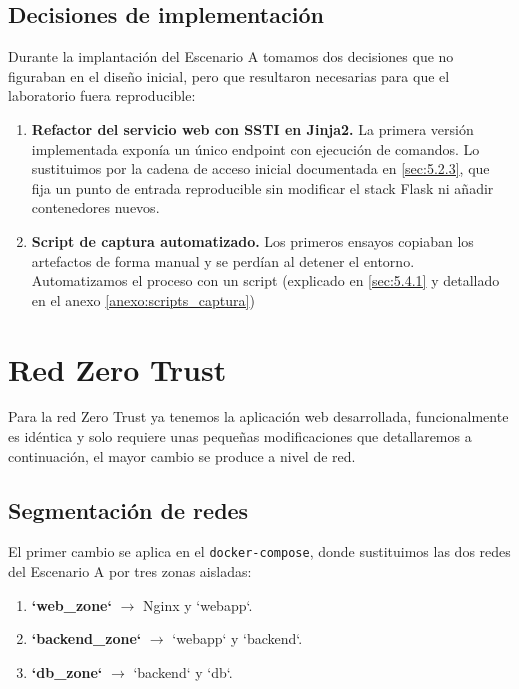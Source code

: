 \documentclass[11pt,spanish,listoffigures,listoftables]{tfgetsinf}
\begin{document}
        \FloatBarrier
        \subsection{Decisiones de implementación}
        \label{sec:5.2.5}

        Durante la implantación del Escenario A tomamos dos decisiones que no figuraban en el diseño inicial, pero que resultaron necesarias para que el laboratorio fuera reproducible:
        \begin{enumerate}
            \item \textbf{Refactor del servicio web con SSTI en Jinja2.} La primera versión implementada exponía un único endpoint con ejecución de comandos. Lo sustituimos por la cadena de acceso inicial documentada en \cref{sec:5.2.3}, que fija un punto de entrada reproducible sin modificar el stack Flask ni añadir contenedores nuevos.
            \item \textbf{Script de captura automatizado.} Los primeros ensayos copiaban los artefactos de forma manual y se perdían al detener el entorno. Automatizamos el proceso con un script (explicado en \cref{sec:5.4.1} y detallado en el anexo \cref{anexo:scripts_captura})
        \end{enumerate}

    \FloatBarrier
    \section{Red Zero Trust}
    Para la red Zero Trust ya tenemos la aplicación web desarrollada, funcionalmente es idéntica y solo requiere unas pequeñas modificaciones que detallaremos a continuación, el mayor cambio se produce a nivel de red.

        \subsection{Segmentación de redes}
        El primer cambio se aplica en el \texttt{docker-compose}, donde sustituimos las dos redes del Escenario A por tres zonas aisladas:
        \begin{enumerate}
            \item \textbf{`web\_zone`} $\rightarrow$ Nginx y `webapp`.
            \item \textbf{`backend\_zone`} $\rightarrow$ `webapp` y `backend`.
            \item \textbf{`db\_zone`} $\rightarrow$ `backend` y `db`.
        \end{enumerate}
\end{document}
